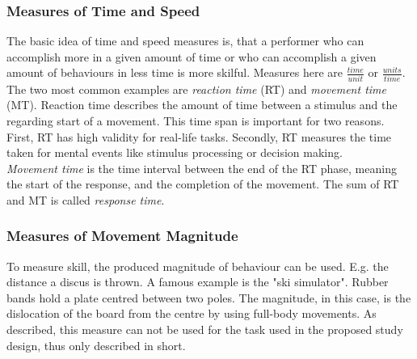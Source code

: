 \subsubsection{Measures of Time and Speed}
\label{section:timeandspeed}
The basic idea of time and speed measures is, that a performer who can accomplish more in a given amount of time or who can accomplish a given amount of behaviours in less time is more skilful. Measures here are
$\frac{time}{unit}$ or $\frac{units}{time}$.\\
The two most common examples are \textit{reaction time} (RT) and \textit{movement time} (MT). Reaction time describes the amount of time between a stimulus and the regarding start of a movement. This time span is important for two reasons. First, RT has high validity for real-life tasks. Secondly, RT measures the time taken for mental events like stimulus processing or decision making.\\
\textit{Movement time} is the time interval between the end of the RT phase, meaning the start of the response, and the completion of the movement. The sum of RT and MT is called \textit{response time}.

\subsubsection{Measures of Movement Magnitude}
To measure skill, the produced magnitude of behaviour can be used. E.g. the distance a discus is thrown. A famous example is the "ski simulator". Rubber bands hold a plate centred between two poles. The magnitude, in this case, is the dislocation of the board from the centre by using full-body movements. As described, this measure can not be used for the task used in the proposed study design, thus only described in short.

